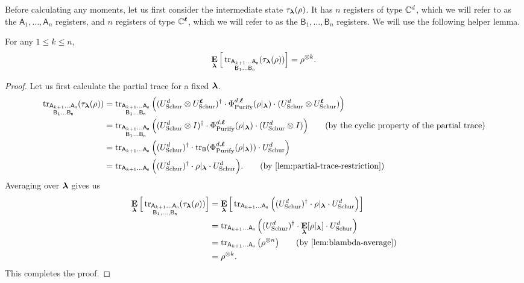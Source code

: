 \documentclass{article}
\newcommand{\purifychan}{\Phi_{\mathrm{Purify}}}
\newcommand{\reg}[1]{\mathsf{#1}}
\newcommand{\schur}{U_{\mathrm{Schur}}}
\begin{document}
Before calculating any moments, let us first consider the intermediate state $\tau_{\boldsymbol{\lambda}}(\rho)$.
It has $n$ registers of type $\mathbb C^d$,
    which we will refer to as the $\reg{A}_1, \ldots, \reg{A}_n$ registers,
    and $n$ registers of type $\mathbb C^{\boldsymbol{\ell}}$,
    which we will refer to as the $\reg{B}_1, \ldots, \reg{B}_n$ registers.    
    We will use the following helper lemma.
\begin{lemma}\label{lem:partial-trace-helper}
For any $1 \leq k \leq n$,
    \begin{equation*}
        \E_{\blambda}\Big[\tr_{\substack{\reg{A}_{k+1} \ldots \reg{A_{n}} \\\reg{B}_1 \ldots \reg{B_{n}}}}(\tau_{\blambda}(\rho))\Big] = \rho^{\otimes k}.
    \end{equation*}
\end{lemma}
\begin{proof}
    Let us first calculate the partial trace for a fixed $\boldsymbol{\lambda}$.
    \begin{align*}
        \tr_{\substack{\reg{A}_{k+1} \ldots \reg{A_{n}} \\\reg{B}_1 \ldots \reg{B_{n}}}}(\tau_{\blambda}(\rho))
        &= \tr_{\substack{\reg{A}_{k+1} \ldots \reg{A_{n}} \\\reg{B}_1 \ldots \reg{B_{n}}}}\Big((\schur^d \otimes \schur^{\bell})^{\dagger} \cdot \purifychan^{d, \bell}(\rho|_{\blambda}) \cdot (\schur^d \otimes \schur^{\bell})\Big)\\
        &= \tr_{\substack{\reg{A}_{k+1} \ldots \reg{A_{n}} \\\reg{B}_1 \ldots \reg{B_{n}}}}\Big((\schur^d \otimes I)^{\dagger} \cdot \purifychan^{d, \bell}(\rho|_{\blambda}) \cdot (\schur^d \otimes I)\Big) \tag{by the cyclic property of the partial trace}\\
        &= \tr_{\reg{A}_{k+1} \ldots \reg{A_{n}}}\Big((\schur^d)^{\dagger} \cdot \tr_{\reg{B}}(\purifychan^{d, \bell}(\rho|_{\blambda})) \cdot \schur^d \Big)\\
        &= \tr_{\reg{A}_{k+1} \ldots \reg{A_{n}}}\Big((\schur^d)^{\dagger} \cdot \rho|_{\blambda} \cdot \schur^d \Big). \tag{by \Cref{lem:partial-trace-restriction}}
    \end{align*}
    Averaging over $\boldsymbol{\lambda}$ gives us
    \begin{align*}
        \E_{\blambda}\Big[\tr_{\substack{\reg{A}_{k+1} \ldots \reg{A_{n}} \\\reg{B}_1, \ldots, \reg{B_{n}}}}(\tau_{\blambda}(\rho))\Big]
        &= \E_{\blambda}\Big[\tr_{\reg{A}_{k+1} \ldots \reg{A_{n}}}\Big((\schur^d)^{\dagger} \cdot \rho|_{\blambda} \cdot \schur^d \Big)\Big]\\
        &= \tr_{\reg{A}_{k+1} \ldots \reg{A_{n}}}\Big((\schur^d)^{\dagger} \cdot \E_{\blambda}[\rho|_{\blambda}] \cdot \schur^d \Big)\\
        &= \tr_{\reg{A}_{k+1} \ldots \reg{A_{n}}}\big(\rho^{\otimes n} \big) \tag{by \Cref{lem:blambda-average}}\\
        &= \rho^{\otimes k}.
    \end{align*}
    This completes the proof.
\end{proof}
\end{document}

